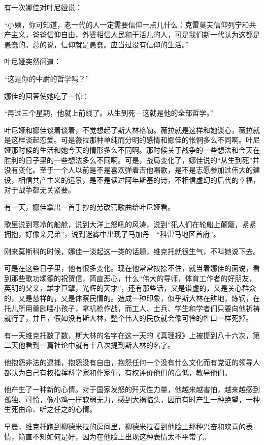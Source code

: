 有一次娜佳对叶尼娅说：

“小姨，你可知道，老一代的人一定需要信仰一点儿什么：克雷莫夫信仰列宁和共产主义，爸爸信仰自由，外婆相信人民和干活儿的人，可是我们新一代认为这都是愚蠢的。总的说，信仰就是愚蠢。应当过没有信仰的生活。”

叶尼娅突然问道：

“这是你的中尉的哲学吗？”

娜佳的回答使她吃了一惊：

“再过三个星期，他就上前线了。从生到死—这就是他的全部哲学。”

叶尼娅和娜佳谈着谈着，不觉想起了斯大林格勒。薇拉就是这样和她谈心，薇拉就是这样谈起恋爱。可是薇拉那种单纯而分明的感情和娜佳的怅惘多么不同啊。叶尼娅那时候的生活和她今天的情形多么不同啊。那时候关于战争的一些想法和今天在胜利的日子里的一些想法多么不同啊。可是，战局变化了，娜佳说的“从生到死”并没有变化。至于一个人以前是不是喜欢弹着吉他唱歌，是不是志愿参加过伟大的建设，相信共产主义的远景，是不是读过阿年斯基的诗，不相信虚幻的后代的幸福，对于战争都无关紧要。

有一天，娜佳拿出一首手抄的劳改营歌曲给叶尼娅看。

歌里说到寒冷的船舱，说到大洋上怒吼的风涛，说到“犯人们在轮船上颠簸，紧紧拥抱，好像亲兄弟”，说到迷雾中出现了马加丹—“科雷马地区首府”。

刚来莫斯科的时候，娜佳一谈起这一类的话题，维克托就很生气，不叫她说下去。

可是在这些日子里，他有很多变化。现在他常常按捺不住，就当着娜佳的面说，看到那些歌功颂德的祝贺信，简直恶心，什么“伟大的导师，体育工作者的好朋友，英明的父亲，雄才巨擘，光辉的天才”，还有那些话，又是谦虚的，又是关心群众的，又是慈祥的，又是体察民情的。造成一种印象，似乎斯大林在耕地，炼钢，在托儿所用羹匙喂小孩子，拿机枪作战，而工人、士兵、学生和学者们只要向他祈祷就行了，并且，假如没有斯大林，整个伟大的民族就会像可怜的牲口一样死掉。

有一天维克托数了数，斯大林的名字在这一天的《真理报》上被提到八十六次，第二天他看到一篇社论中就有十八次提到斯大林的名字。

他抱怨非法的逮捕，抱怨没有自由，抱怨任何一个没有什么文化而有党证的领导人都认为自己有权指挥科学家和作家们，有权评价他们的高低，教导他们。

他产生了一种新的心情。对于国家发怒的歼灭性力量，他越来越害怕，越来越感到孤独、可怜，像小鸡一样软弱无力，感到大祸临头，因而有时产生一种绝望，一种生死由命、听之任之的心情。

早晨，维克托跑到柳德米拉的房间里，柳德米拉看到他脸上那种兴奋和欢喜的表情，简直不知如何是好，因为在他脸上出现这种表情太不平常了。

